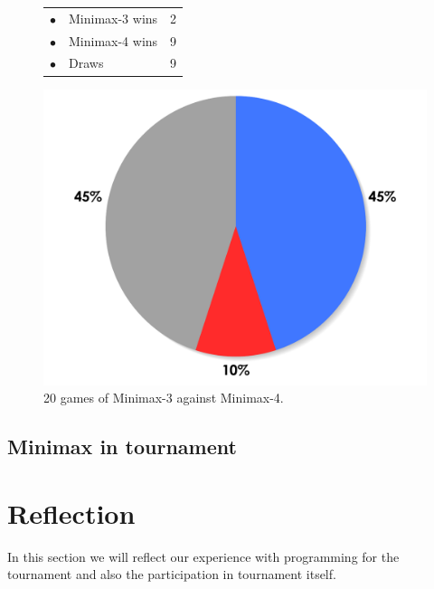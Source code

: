 \documentclass[paper=a4, fontsize=11pt]{article} %
\newcommand{\ra}[1]{\renewcommand{\arraystretch}{#1}}
\begin{document}
\begin{figure}[ht]
    \begin{minipage}[c]{0.40\linewidth}
        \centering
        \ra{1.3}
        \begin{tabular}{cll}
            \toprule
            \textcolor{red!100}{$\bullet$} & Minimax-3 wins & 2       \\
            \textcolor{blue!100!yellow!100!red!80}{$\bullet$} & Minimax-4 wins & 9      \\  
            \textcolor{gray!100}{$\bullet$} & Draws & 9      \\  
            \bottomrule
        \end{tabular}
    \end{minipage}
    \begin{minipage}[c]{0.60\linewidth}
        \centering
        \includegraphics[scale=0.35]{img/minimax3-minimax4.pdf}
    \end{minipage}
    \caption{20 games of Minimax-3 against Minimax-4.}
    \label{fig:minimax3-minimax4}
\end{figure}

\subsection{Minimax in tournament}

\section{Reflection}
In this section we will reflect our experience with programming for the tournament and also the participation in tournament itself.
\end{document}
